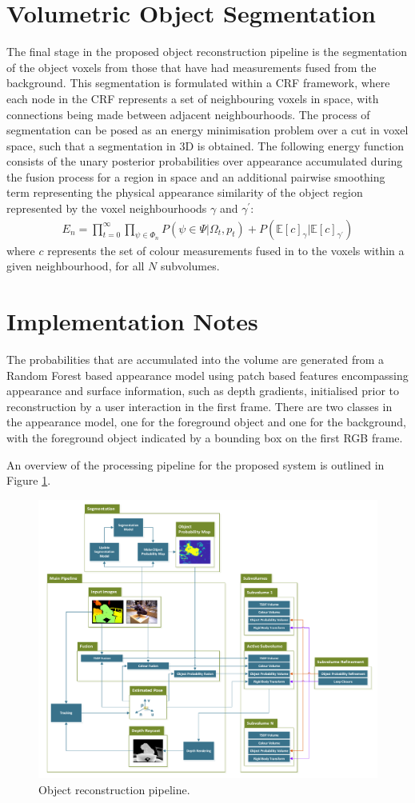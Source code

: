 \section{Volumetric Object Segmentation}
The final stage in the proposed object reconstruction pipeline is the segmentation of the object voxels from those that have had measurements fused 
from the background. This segmentation is formulated within a CRF framework, where each node in the CRF represents a set of neighbouring voxels in space, 
with connections being made between adjacent neighbourhoods. The process of segmentation can be posed as an energy minimisation problem over a cut in voxel space, 
such that a segmentation in 3D is obtained. The following energy function consists of the unary posterior probabilities over appearance accumulated during the fusion 
process for a region in space and an additional pairwise smoothing term representing the physical appearance similarity of the object region represented by the voxel 
neighbourhoods $\gamma$ and $\gamma^{'}$:
\begin{equation}
\begin{split}
E_{n} = \prod_{t=0}^{\infty} \prod_{\psi \in \Phi_{n}} P(\psi \in \Psi | \Omega_{t}, p_{t}) + P(\mathbb{E}[c]_{\gamma} | \mathbb{E}[c]_{\gamma^{'}})
\end{split}
\end{equation}
where $c$ represents the set of colour measurements fused in to the voxels within a given neighbourhood, for all $N$ subvolumes.

\section{Implementation Notes}
The probabilities that are accumulated into the volume are generated from a Random Forest based appearance model using patch based features encompassing 
appearance and surface information, such as depth gradients, initialised prior to reconstruction by a user interaction in the first frame. There are two 
classes in the appearance model, one for the foreground object and one for the background, with the foreground object indicated by a bounding box on the 
first RGB frame.

An overview of the processing pipeline for the proposed system is outlined in Figure \ref{pipelineDiagram}.
\begin{figure}[!t]
	\centering
	\includegraphics[width=\linewidth]{pipeline.pdf}
	\caption{Object reconstruction pipeline.}
	\label{pipelineDiagram}
\end{figure}